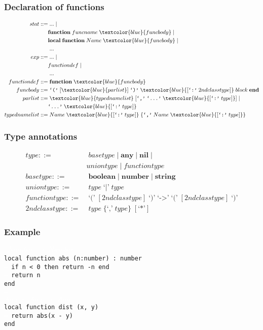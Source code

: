 \documentclass{beamer}
\begin{document}
\begin{frame}
\frametitle{Declaration of functions}
\begin{align*}
stat ::= & \; ... \; |\\
& \textbf{function} \; funcname \; \textcolor{blue}{funcbody} \; |\\
& \textbf{local} \; \textbf{function} \; Name \; \textcolor{blue}{funcbody} \; |\\
& \; ... \\
exp ::= & \; ... \; |\\
& functiondef \; |\\
& \; ...\\
functiondef ::= & \; \textbf{function} \; \textcolor{blue}{funcbody}\\
funcbody ::= & \; \texttt{`('} \; [\textcolor{blue}{parlist}] \; \texttt{`)'} \;
\textcolor{blue}{[\texttt{`:'} \; 2ndclasstype]} \; block \; \textbf{end}\\
parlist ::= & \; \textcolor{blue}{typednamelist} \; [\texttt{`,'} \; \texttt{`...'} \;
\textcolor{blue}{[\texttt{`:'} \; type]}] \; | \;\\
& \texttt{`...'} \; \textcolor{blue}{[\texttt{`:'} \; type]}\\
typednamelist ::= & \; Name \; \textcolor{blue}{[\texttt{`:'} \; type]} \;
\{\texttt{`,'} \; Name \; \textcolor{blue}{[\texttt{`:'} \; type]}\}
\end{align*}
\end{frame}

\begin{frame}
\frametitle{Type annotations}
\begin{align*}
type ::= & \; basetype \;|\; \textbf{any} \;|\; \textbf{nil} \;|\\
& uniontype \;|\; functiontype\\
basetype ::= & \; \textbf{boolean} \;|\; \textbf{number} \;|\; \textbf{string}\\
uniontype ::= & \; type \;\texttt{`|'}\; type\\
functiontype ::= & \; \texttt{`('} \; [2ndclasstype] \; \texttt{`)'} \;
\texttt{`->'} \; \texttt{`('} \; [2ndclasstype] \; \texttt{`)'}\\
2ndclasstype ::= & \; type \; \{\texttt{`,'} \; type\} \; [\texttt{`*'}]
\end{align*}
\end{frame}

\begin{frame}
\frametitle{Example}
{\tt
\textcolor{white}{$Number \;\rightarrow\; Number$}\\
local function abs (n:number) : number\\
\textcolor{white}{--} if n < 0 then return -n end\\
\textcolor{white}{--} return n\\
end\\
\textcolor{white}{--}\\
\textcolor{white}{$Any \;\times\; Any \;\rightarrow\; Any$}\\
local function dist (x, y)\\
\textcolor{white}{--} return abs(x - y)\\
end\\
}
\end{frame}
\end{document}
